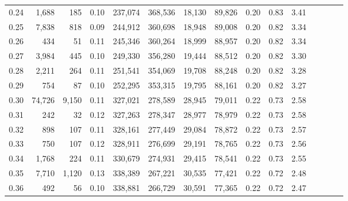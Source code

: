 \begin{tabular}{rrrcrrrrrrrrrrr}
0.24 &   1,688 &     185 &                                       0.10 &  237,074 &  368,536 &   18,130 &   89,826 &  0.20 &  0.83 &                         3.41 \\
0.25 &   7,838 &     818 &                                       0.09 &  244,912 &  360,698 &   18,948 &   89,008 &  0.20 &  0.82 &                         3.34 \\
0.26 &     434 &      51 &                                       0.11 &  245,346 &  360,264 &   18,999 &   88,957 &  0.20 &  0.82 &                         3.34 \\
0.27 &   3,984 &     445 &                                       0.10 &  249,330 &  356,280 &   19,444 &   88,512 &  0.20 &  0.82 &                         3.30 \\
0.28 &   2,211 &     264 &                                       0.11 &  251,541 &  354,069 &   19,708 &   88,248 &  0.20 &  0.82 &                         3.28 \\
0.29 &     754 &      87 &                                       0.10 &  252,295 &  353,315 &   19,795 &   88,161 &  0.20 &  0.82 &                         3.27 \\
0.30 &  74,726 &   9,150 &                                       0.11 &  327,021 &  278,589 &   28,945 &   79,011 &  0.22 &  0.73 &                         2.58 \\
0.31 &     242 &      32 &                                       0.12 &  327,263 &  278,347 &   28,977 &   78,979 &  0.22 &  0.73 &                         2.58 \\
0.32 &     898 &     107 &                                       0.11 &  328,161 &  277,449 &   29,084 &   78,872 &  0.22 &  0.73 &                         2.57 \\
0.33 &     750 &     107 &                                       0.12 &  328,911 &  276,699 &   29,191 &   78,765 &  0.22 &  0.73 &                         2.56 \\
0.34 &   1,768 &     224 &                                       0.11 &  330,679 &  274,931 &   29,415 &   78,541 &  0.22 &  0.73 &                         2.55 \\
0.35 &   7,710 &   1,120 &                                       0.13 &  338,389 &  267,221 &   30,535 &   77,421 &  0.22 &  0.72 &                         2.48 \\
0.36 &     492 &      56 &                                       0.10 &  338,881 &  266,729 &   30,591 &   77,365 &  0.22 &  0.72 &                         2.47 \\

\end{tabular}
